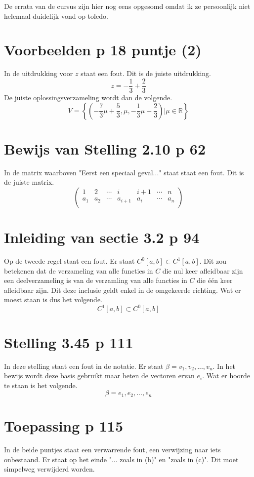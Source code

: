 \documentclass[lineaire_algebra_oplossingen.tex]{subfiles}
\begin{document}
\noindent De errata van de cursus zijn hier nog eens opgesomd omdat ik ze persoonlijk niet helemaal duidelijk vond op toledo.

\section{Voorbeelden p 18 puntje (2)}
In de uitdrukking voor $z$ staat een fout. Dit is de juiste uitdrukking.
\[
z = -\frac{1}{3} + \frac{2}{3}
\]
De juiste oplossingsverzameling wordt dan de volgende.
\[
V = \left\{\left(-\frac{7}{3}\mu+\frac{5}{3},\mu,-\frac{1}{3}\mu + \frac{2}{3}\right) | \mu \in \mathbb{R}\right\}
\]

\section{Bewijs van Stelling 2.10 p 62}
In de matrix waarboven "Eerst een speciaal geval..." staat staat een fout. Dit is de juiste matrix.
\[
\begin{pmatrix}
1 & 2 & \cdots & i & i+1 & \cdots & n\\
a_1 & a_2 & \cdots & a_{i+1} & a_i & \cdots & a_n\\ 
\end{pmatrix}
\]

\section{Inleiding van sectie 3.2 p 94}
Op de tweede regel staat een fout. Er staat $C^0[a,b] \subset C^1[a,b]$.
Dit zou betekenen dat de verzameling van alle functies in $C$ die nul keer afleidbaar zijn een deelverzameling is van de verzamling van alle functies in $C$ die \'e\'en keer afleidbaar zijn.
Dit deze inclusie geldt enkel in de omgekeerde richting. Wat er moest staan is dus het volgende.
\[
C^1[a,b] \subset C^0[a,b]
\]

\section{Stelling 3.45 p 111}
In deze stelling staat een fout in de notatie. Er staat $\beta = v_1,v_2,...,v_n$.
In het bewijs wordt deze basis gebruikt maar heten de vectoren ervan $e_i$.
Wat er hoorde te staan is het volgende.
\[
\beta = e_1,e_2,...,e_n
\]

\section{Toepassing p 115}
In de beide puntjes staat een verwarrende fout, een verwijzing naar iets onbestaand.
Er staat op het einde "... zoals in (b)" en "zoals in (c)".
Dit moet simpelweg verwijderd worden.
\end{document}
